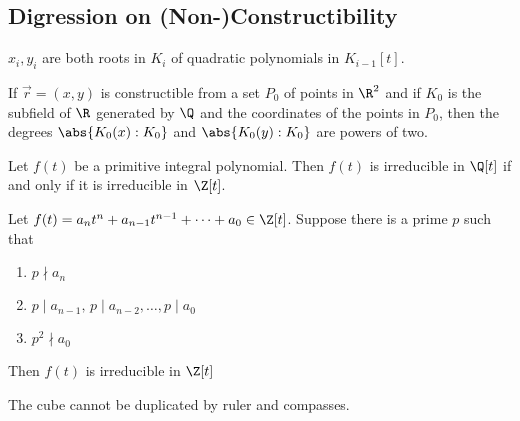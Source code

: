 \documentclass{article}
\begin{document}
\subsection{Digression on (Non-)Constructibility}















\begin{nlemma}\label{lem:1.13}
    $x_i, y_i$ are both roots in $K_i$ of quadratic polynomials in $K_{i-1}[t]$.
\end{nlemma}


\begin{nthm}\label{thm:1.14}
    If $\vec{r} = (x, y)$ is constructible from a set $P_0$ of points in $\R^2$ and if $K_0$ is the subfield of $\R$ generated by $\Q$ and the coordinates of the points in $P_0$, then the degrees $\abs{K_0(x) : K_0}$ and $\abs{K_0(y):K_0}$ are powers of two.
\end{nthm}



\begin{nthm}\label{thm:1.15}
    Let $f(t)$ be a primitive integral polynomial.  Then $f(t)$ is irreducible in $\Q[t]$ if and only if it is irreducible in $\Z[t]$.
\end{nthm}

\begin{nthm}\label{thm:1.16}
    Let $f(t) = a_n t^n + a_{n-1} t^{n-1} + \dots + a_0 \in \Z[t]$.
    Suppose there is a prime $p$ such that
    \begin{enumerate}[label=(\roman*)]
        \item $p \nmid a_n$
        \item $p \mid a_{n-1}, \, p \mid a_{n-2}, \dotsc, p \mid a_0$
        \item $p^2 \nmid a_0$
    \end{enumerate}
    Then $f(t)$ is irreducible in $\Z[t]$
\end{nthm}












\begin{nthm}\label{thm:1.17}
    The cube cannot be duplicated by ruler and compasses.
\end{nthm}
\end{document}
